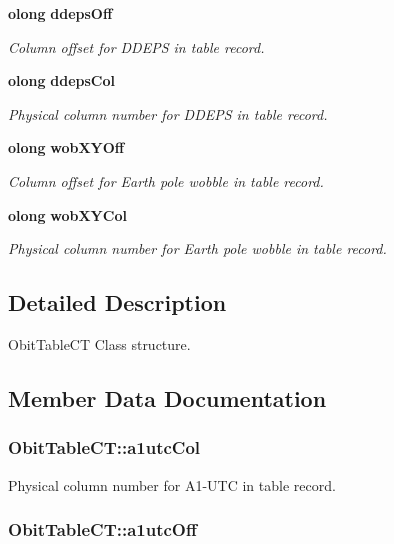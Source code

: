 \begin{CompactItemize}
{\bf olong} {\bf ddeps\-Off}
\begin{CompactList}\small\item\em Column offset for DDEPS in table record. \item\end{CompactList}\item 
{\bf olong} {\bf ddeps\-Col}
\begin{CompactList}\small\item\em Physical column number for DDEPS in table record. \item\end{CompactList}\item 
{\bf olong} {\bf wob\-XYOff}
\begin{CompactList}\small\item\em Column offset for Earth pole wobble in table record. \item\end{CompactList}\item 
{\bf olong} {\bf wob\-XYCol}
\begin{CompactList}\small\item\em Physical column number for Earth pole wobble in table record. \item\end{CompactList}\end{CompactItemize}


\subsection{Detailed Description}
Obit\-Table\-CT Class structure. 



\subsection{Member Data Documentation}
\subsubsection{ {\bf Obit\-Table\-CT::a1utc\-Col}}\label{structObitTableCT_o54}


Physical column number for A1-UTC in table record. 

\subsubsection{ {\bf Obit\-Table\-CT::a1utc\-Off}}\label{structObitTableCT_o53}


